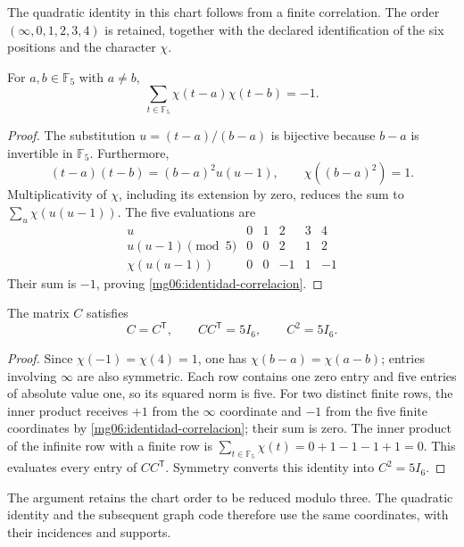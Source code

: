 The quadratic identity in this chart follows from a finite
correlation. The order \((\infty,0,1,2,3,4)\) is retained,
together with the declared identification of the six positions
and the character \(\chi\).

\begin{lemma}
\label{mg06:correlacion}
For \(a,b\in\mathbb F_5\) with \(a\ne b\),
\begin{equation}
 \sum_{t\in\mathbb F_5}\chi(t-a)\chi(t-b)=-1.
 \label{mg06:identidad-correlacion}
\end{equation}
\end{lemma}
\begin{proof}
The substitution \(u=(t-a)/(b-a)\) is bijective because \(b-a\)
is invertible in \(\mathbb F_5\). Furthermore,
\[
 (t-a)(t-b)=(b-a)^2u(u-1),\qquad
 \chi((b-a)^2)=1.
\]
Multiplicativity of \(\chi\), including its extension by zero,
reduces the sum to \(\sum_u\chi(u(u-1))\). The five evaluations are
\begin{equation}
\begin{array}{c|rrrrr}
 u&0&1&2&3&4\\\hline
 u(u-1)\pmod5&0&0&2&1&2\\
 \chi(u(u-1))&0&0&-1&1&-1
\end{array}
\label{mg06:cinco-evaluaciones}
\end{equation}
Their sum is \(-1\), proving
\eqref{mg06:identidad-correlacion}.
\end{proof}

\begin{proposition}
\label{mg06:conferencia}
The matrix \(C\) satisfies
\begin{equation}
 C=C^{\mathsf T},\qquad CC^{\mathsf T}=5I_6,
 \qquad C^2=5I_6.
 \label{mg06:identidad-conferencia}
\end{equation}
\end{proposition}
\begin{proof}
Since \(\chi(-1)=\chi(4)=1\), one has
\(\chi(b-a)=\chi(a-b)\); entries involving \(\infty\) are
also symmetric. Each row contains one zero entry and five entries
of absolute value one, so its squared norm is five. For two distinct
finite rows, the inner product receives \(+1\) from the
\(\infty\) coordinate and \(-1\) from the five finite coordinates
by \eqref{mg06:identidad-correlacion}; their sum is zero.
The inner product of the infinite row with a finite row is
\(\sum_{t\in\mathbb F_5}\chi(t)=0+1-1-1+1=0\).
This evaluates every entry of \(CC^{\mathsf T}\).
Symmetry converts this identity into \(C^2=5I_6\).
\end{proof}

The argument retains the chart order to be reduced modulo three.
The quadratic identity and the subsequent graph code therefore use
the same coordinates, with their incidences and supports.
